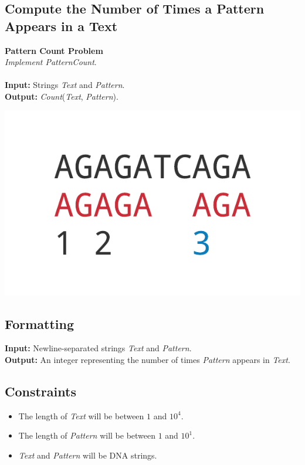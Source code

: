 \documentclass{article}
\begin{document}
\subsection{Compute the Number of Times a Pattern Appears in a Text}
\hline\vspace{5}
\noindent \textbf{Pattern Count Problem}\\
\emph{Implement PatternCount}.\\ \\
\textbf{Input:} Strings \emph{Text} and \emph{Pattern}.\\
\textbf{Output:} \emph{Count}(\emph{Text}, \emph{Pattern}).
\begin{center}
    \includegraphics[scale=0.32]{c1/logos/1A.png} 
\end{center}
\hline\vspace{5}

\subsection*{Formatting}
\textbf{Input:} Newline-separated strings \emph{Text} and \emph{Pattern}.\\
\noindent \textbf{Output:} An integer representing the number of times \emph{Pattern} appears in \emph{Text}.

\subsection*{Constraints}
\begin{itemize}
    \item The length of \emph{Text} will be between $1$ and $10^4$.
    \item The length of \emph{Pattern} will be between $1$ and $10^1$.
    \item \emph{Text} and \emph{Pattern} will be DNA strings.
\end{itemize}
\pagebreak
\end{document}
